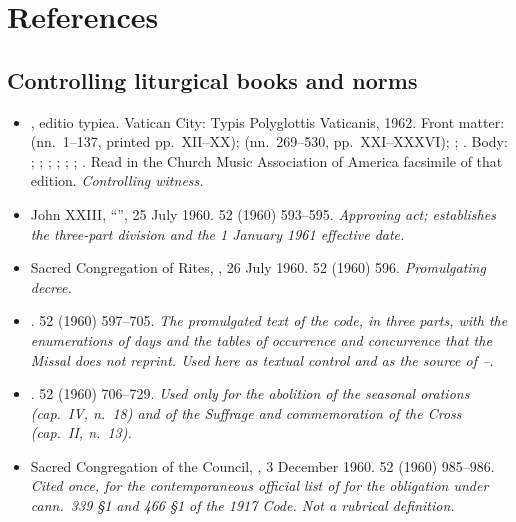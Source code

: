 \section{References}

\subsection*{Controlling liturgical books and norms}

\begin{itemize}
\item {}, editio typica. Vatican City:
Typis Polyglottis Vaticanis, 1962. Front matter: 
(nn.~1--137, printed pp.~XII--XX); 
(nn.~269--530, pp.~XXI--XXXVI); ;
. Body: ; ;
; ; ;
; . Read in the Church Music
Association of America facsimile of that edition. \emph{Controlling witness.}

\item John XXIII, 
``'', 25 July 1960. 
52 (1960) 593--595. \emph{Approving act; establishes the three-part division
and the 1 January 1961 effective date.}

\item Sacred Congregation of Rites, , 26 July 1960.
 52 (1960) 596. \emph{Promulgating decree.}

\item {}.  52 (1960) 597--705. \emph{The promulgated text of the code, in three
parts, with the enumerations of days and the tables of occurrence and
concurrence that the Missal does not reprint. Used here as textual control and
as the source of --.}

\item {}.  52 (1960) 706--729. \emph{Used only
for the abolition of the seasonal orations (cap.~IV, n.~18) and of the Suffrage
and commemoration of the Cross (cap.~II, n.~13).}

\item Sacred Congregation of the Council, ,
3 December 1960.  52 (1960) 985--986.
\emph{Cited once, for the contemporaneous official list of  for the  obligation under cann.~339 \S1 and 466
\S1 of the 1917 Code. Not a rubrical definition.}
\end{itemize}

